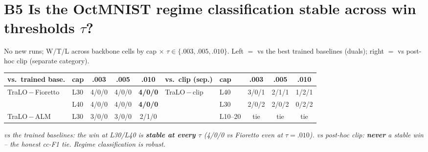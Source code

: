 \documentclass[10pt,a4paper]{article}
\newcommand{\vs}[2]{#1\,$-$\,#2}
\newcommand{\fnd}[1]{{\small\textit{#1}}\par}
\newcommand{\tbl}[1]{\begin{center}\footnotesize #1\end{center}}
\begin{document}
\section*{B5 \; Is the OctMNIST regime classification stable across win thresholds $\tau$?}
{\footnotesize No new runs; W/T/L across backbone cells by cap $\times$ $\tau\in\{.003,.005,.010\}$. Left $=$
vs the best trained baselines (duals); right $=$ vs post-hoc clip (separate category).}
\tbl{\begin{tabular}{llccc@{\qquad}llccc}
\toprule
vs.\ trained base. & cap & .003 & .005 & .010 & vs.\ clip (sep.) & cap & .003 & .005 & .010 \\
\midrule
\vs{TraLO}{Fioretto} & L30 & 4/0/0 & 4/0/0 & \textbf{4/0/0} & \vs{TraLO}{clip} & L40 & 3/0/1 & 2/1/1 & 1/2/1 \\
                     & L40 & 4/0/0 & 4/0/0 & \textbf{4/0/0} &                  & L30 & 2/0/2 & 2/0/2 & 0/2/2 \\
\vs{TraLO}{ALM}      & L30 & 3/0/0 & 3/0/0 & 2/1/0          &                  & L10--20 & tie & tie & tie \\
\bottomrule
\end{tabular}}
\fnd{vs the trained baselines: the win at L30/L40 is \textbf{stable at every $\tau$} (4/0/0 vs Fioretto even at
$\tau{=}.010$). vs post-hoc clip: \textbf{never} a stable win -- the honest cc-F1 tie. Regime classification is
robust.}

\end{document}
